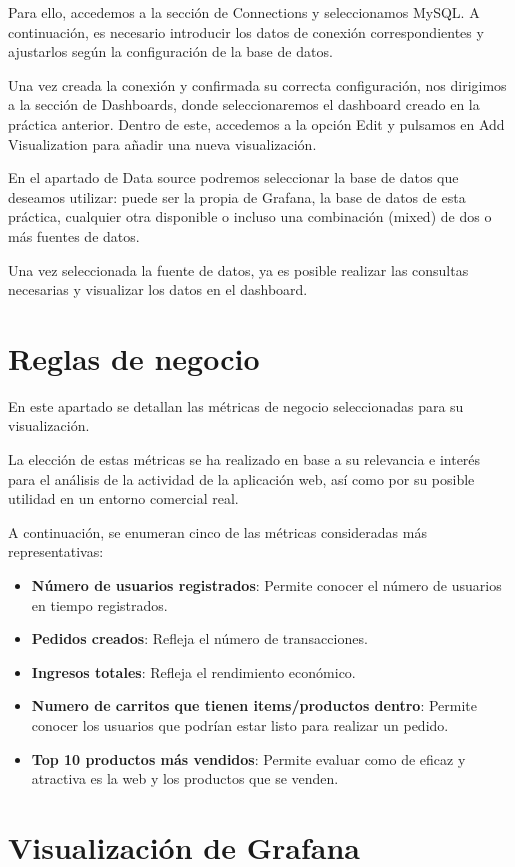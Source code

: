 \documentclass[10pt]{book}
\begin{document}
Para ello, accedemos a la sección de Connections y seleccionamos MySQL. A continuación, es necesario introducir los datos de conexión correspondientes y ajustarlos según la configuración de la base de datos.

Una vez creada la conexión y confirmada su correcta configuración, nos dirigimos a la sección de Dashboards, donde seleccionaremos el dashboard creado en la práctica anterior. Dentro de este, accedemos a la opción Edit y pulsamos en Add Visualization para añadir una nueva visualización.

En el apartado de Data source podremos seleccionar la base de datos que deseamos utilizar: puede ser la propia de Grafana, la base de datos de esta práctica, cualquier otra disponible o incluso una combinación (mixed) de dos o más fuentes de datos.

Una vez seleccionada la fuente de datos, ya es posible realizar las consultas necesarias y visualizar los datos en el dashboard.

\section{Reglas de negocio} \cite{metricas_boske}
En este apartado se detallan las métricas de negocio seleccionadas para su visualización.

La elección de estas métricas se ha realizado en base a su relevancia e interés para el análisis de la actividad de la aplicación web, así como por su posible utilidad en un entorno comercial real.

A continuación, se enumeran cinco de las métricas consideradas más representativas:
\begin{itemize}
    \item \textbf{Número de usuarios registrados}: Permite conocer el número de usuarios en tiempo registrados.
    \item \textbf{Pedidos creados}: Refleja el número de transacciones. 
    \item \textbf{Ingresos totales}: Refleja el rendimiento económico.
    \item \textbf{Numero de carritos que tienen items/productos dentro}: Permite conocer los usuarios que podrían estar listo para realizar un pedido.
    \item \textbf{Top 10 productos más vendidos}: Permite evaluar como de eficaz y atractiva es la web y los productos que se venden.
\end{itemize}

\section{Visualización de Grafana}\label{sec:visualizacion}
\end{document}

